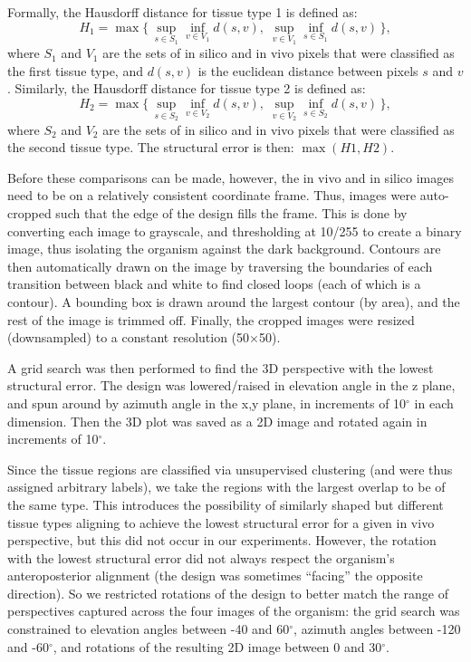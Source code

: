 Formally, the Hausdorff distance for tissue type 1 is defined as:
$$H_1= \max \{ \, \sup_{s \in S_1} \inf_{v \in V_1} d(s, v), \;  \sup_{v \in V_1} \inf_{s \in S_1} d(s, v) \, \},$$
where $S_1$ and $V_1$ are the sets of in silico and in vivo pixels that were classified as the first tissue type, and $d(s, v)$ is the euclidean distance between pixels $s$ and $v$. 
Similarly, the Hausdorff distance for tissue type 2 is defined as:
$$H_2= \max \{ \, \sup_{s \in S_2} \inf_{v \in V_2} d(s, v), \; \sup_{v \in V_2} \inf_{s \in S_2} d(s, v) \, \},$$
where $S_2$ and $V_2$ are the sets of in silico and in vivo pixels that were classified as the second tissue type. The structural error is then:
$\max(H1, H2)$.

Before these comparisons can be made, however, the in vivo and in silico images need to be on a relatively consistent coordinate frame. 
Thus, images were auto-cropped such that the edge of the design fills the frame. 
This is done by converting each image to grayscale, and thresholding at 10/255 to create a binary image, thus isolating the organism against the dark background. 
Contours are then automatically drawn on the image by traversing the boundaries of each transition between black and white to find closed loops (each of which is a contour). 
A bounding box is drawn around the largest contour (by area), and the rest of the image is trimmed off. 
Finally, the cropped images were resized (downsampled) to a constant resolution (50{$\times$}50).

A grid search was then performed to find the 3D perspective with the lowest structural error. 
The design was lowered/raised in elevation angle in the z plane, and spun around by azimuth angle in the x,y plane, in increments of 10{$^{\circ}$} in each dimension. 
Then the 3D plot was saved as a 2D image and rotated again in increments of 10{$^{\circ}$}. 

Since the tissue regions are classified via unsupervised clustering (and were thus assigned arbitrary labels), we take the regions with the largest overlap to be of the same type. 
This introduces the possibility of similarly shaped but different tissue types aligning to achieve the lowest structural error for a given in vivo perspective, but this did not occur in our experiments. 
However, the rotation with the lowest structural error did not always respect the organism's anteroposterior alignment (the design was sometimes ``facing'' the opposite direction). 
So we restricted rotations of the design to better match the range of perspectives captured across the four images of the organism: the grid search was constrained to elevation angles between -40 and 60{$^{\circ}$}, azimuth angles between -120 and -60{$^{\circ}$}, and rotations of the resulting 2D image between 0 and 30{$^{\circ}$}.

